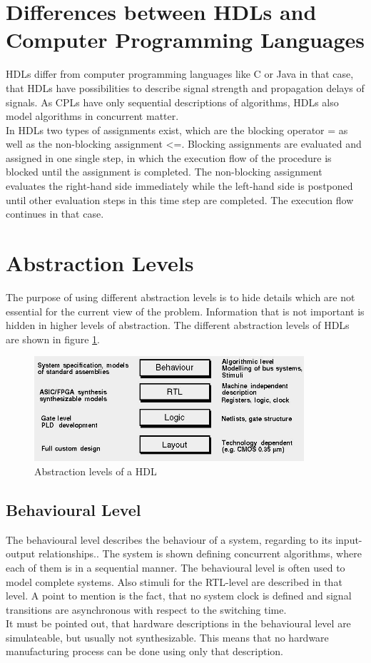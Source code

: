 \section{Differences between HDLs and Computer Programming Languages}
HDLs differ from computer programming languages like C or Java in that case, that HDLs have possibilities to describe signal strength and propagation delays of signals. As CPLs have only sequential descriptions of algorithms, HDLs also model algorithms in concurrent matter.\\
In HDLs two types of assignments exist, which are the blocking operator = as well as the non-blocking assignment \textless=. Blocking assignments are evaluated and assigned in one single step, in which the execution flow of the procedure is blocked until the assignment is completed. The non-blocking assignment evaluates the right-hand side immediately while the left-hand side is postponed until other evaluation steps in this time step are completed. The execution flow continues in that case.\cite{Sut96}
\section{Abstraction Levels}
The purpose of using different abstraction levels is to hide details which are not essential for the current view of the problem. Information that is not important is hidden in higher levels of abstraction. The different abstraction levels of HDLs are shown in figure \ref{fig:hdlabstractionlevels}.
\begin{figure}[htbp]
\begin{center}
\includegraphics[width=10cm,keepaspectratio=true]{bilder/png/hdlabstractionlevels}
\caption{Abstraction levels of a HDL \cite{Ver16}}
\label{fig:hdlabstractionlevels}
\end{center}
\end{figure}
\subsection{Behavioural Level}
The behavioural level describes the behaviour of a system, regarding to its input-output relationships.\cite{Hartenstein1987}. The system is shown defining concurrent algorithms, where each of them is in a sequential manner. The behavioural level is often used to model complete systems. Also stimuli for the RTL-level are described in that level. A point to mention is the fact, that no system clock is defined and signal transitions are asynchronous with respect to the switching time.\\
It must be pointed out, that hardware descriptions in the behavioural level are simulateable, but usually not synthesizable. This means that no hardware manufacturing process can be done using only that description.\cite{Ver16}
